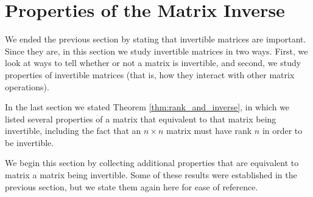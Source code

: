 \section{Properties of the Matrix Inverse}\label{sec:inverse_prop}


We ended the previous section by stating that invertible matrices are important. Since they are, in this section we study invertible matrices in two ways. First, we look at ways to tell whether or not a matrix is invertible, and second, we study properties of invertible matrices (that is, how they interact with other matrix operations). 

In the last section we stated Theorem \ref{thm:rank_and_inverse}, in which we listed several properties of a matrix that equivalent to that matrix being invertible, including the fact that an $n\times n$ matrix must have rank $n$ in order to be invertible.

We begin this section by collecting additional properties that are equivalent to matrix a matrix being invertible. Some of these results were established in the previous section, but we state them again here for ease of reference.


\smallskip

